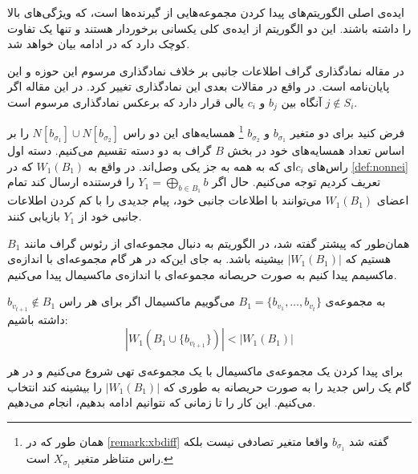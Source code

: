 ایده‌ی اصلی الگوریتم‌های
 پیدا کردن مجموعه‌هایی از گیرنده‌ها است، که ویژگی‌های بالا را داشته باشند. این دو الگوریتم از ایده‌ی کلی یکسانی برخوردار هستند و تنها یک تفاوت کوچک دارد که در ادامه بیان خواهد شد.
 
 \begin{remark}
 	در مقاله
 	\cite{pliablefirstpaper}
 	نمادگذاری گراف اطلاعات جانبی بر خلاف نمادگذاری مرسوم این حوزه و این پایان‌نامه است. در واقع در مقالات بعدی این نمادگذاری تغییر کرد. در این مقاله اگر
 	$j \notin S_i$
 	آنگاه بین
 	$b_j$
 	و
 	$c_i$
 	یالی قرار دارد که برعکس نمادگذاری مرسوم است.
 \end{remark}
 
 فرض کنید برای دو متغیر
 $b_{\sigma_1}$
 و
 $b_{\sigma_2}$
 \footnote{
 همان طور که در
 \autoref{remark:xbdiff}
 گفته شد 
 $b_{\sigma_1}$
 واقعا متغیر تصادفی نیست بلکه راس متناظر متغیر
 $X_{\sigma_1}$
 است.
 }
 همسایه‌های این دو راس
 $N[b_{\sigma_1}] \cup N[b_{\sigma_2}]$
 را بر اساس تعداد همسایه‌های خود در بخش
 $B$
 گراف به دو دسته تقسیم می‌کنیم. دسته اول راس‌های
 $c_i$ای
 که به همه به جز یکی وصل‌اند. در واقع به
 $W_1(B_1)$
 که در
 \autoref{def:nonnei}
 تعریف کردیم توجه می‌کنیم. حال اگر
  $Y_1 = \bigoplus\limits_{b \in B_1} b$
  را فرستنده ارسال کند تمام اعضای
  $W_1(B_1)$
  می‌توانند با اطلاعات جانبی خود، پیام جدیدی را با کم کردن اطلاعات جانبی خود از
  $Y_1$
  بازیابی کنند.
  
 همان‌طور که پیشتر گفته شد، در الگوریتم
\GRCOVone
به دنبال مجموعه‌ای از رئوس گراف مانند
$B_1$
هستیم که 
$|W_1(B_1)|$
بیشینه باشد. به جای این‌که در هر گام مجموعه‌ای با اندازه‌ی ماکسیمم پیدا کنیم به صورت حریصانه مجموعه‌ای با اندازه‌ی ماکسیمال پیدا می‌کنیم.

\begin{definition}
به مجموعه‌ی 
$B_1 = \{b_{v_1}, \ldots, b_{v_t}\}$
می‌گوییم ماکسیمال اگر برای هر راس
$b_{v_{t  +1}} \notin B_1$
داشته باشیم:
\begin{equation}
	\tag{شرط ماکسیمال بودن}
	|W_1(B_1 \cup \{b_{v_{t + 1}} \})| < |W_1(B_1)|
\end{equation}
\end{definition}

برای پیدا کردن یک مجموعه‌ی ماکسیمال با یک مجموعه‌ی تهی شروع می‌کنیم و در هر گام یک راس جدید را به صورت حریصانه به طوری که 
$|W_1(B_1)|$
را بیشینه کند انتخاب می‌کنیم. این کار را تا زمانی که نتوانیم ادامه بدهیم، انجام می‌دهیم.

